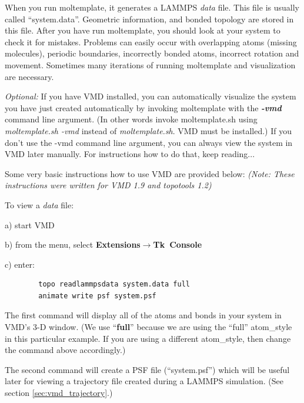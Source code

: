 \documentclass[11pt]{article}
\begin{document}
When you run moltemplate, it generates a LAMMPS \textit{data} file. 
This file is usually called ``system.data''.
Geometric information, and bonded topology are stored in this file.
After you have run moltemplate, you should look at your system 
to check it for mistakes. 
Problems can easily occur with overlapping atoms (missing molecules), 
periodic boundaries, incorrectly bonded atoms, incorrect rotation and movement.
Sometimes many iterations of running moltemplate and 
visualization are necessary.  

\textit{Optional:}
If you have VMD installed, you can automatically visualize the system
you have just created automatically by invoking moltemplate with 
the \textit{\textbf{-vmd}} command line argument.
(In other words invoke moltemplate.sh using \textit{moltemplate.sh -vmd}
 instead of \textit{moltemplate.sh}.  VMD must be installed.)
If you don't use the -vmd command line argument, you can always view the 
system in VMD later manually.  For instructions how to do that, 
keep reading...

Some very basic instructions how to use VMD are provided below:
\textit{(Note: These instructions were written for VMD 1.9 and topotools 1.2)}

To view a \textit{data} file:
\begin{list}{}
\item a) start VMD
\item b) from the menu, select 
         \textbf{Extensions}$\rightarrow$\mbox{\textbf{Tk Console}} 
\item c) enter:
\end{list}
\begin{verbatim}
        topo readlammpsdata system.data full
        animate write psf system.psf
\end{verbatim}
\begin{list}{}
\item The first command will display all of the atoms and bonds in your system
in VMD's 3-D window.  (We use ``\textbf{full}'' because we are using the 
``full'' atom\_style in this particular example.  If you are using a different 
atom\_style, then change the command above accordingly.)
\item The second command
will create a PSF file (``system.psf'') which will 
be useful later for viewing a trajectory file created 
during a LAMMPS simulation.
(See section \ref{sec:vmd_trajectory}.)
\end{list}
\end{document}
